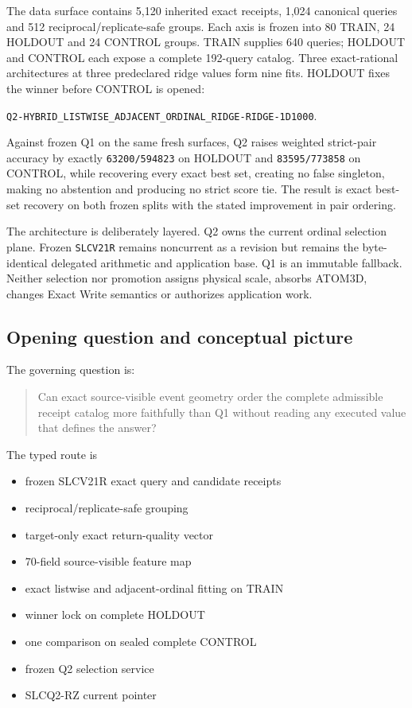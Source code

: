 The data surface contains 5,120 inherited exact receipts, 1,024
canonical queries and 512 reciprocal/replicate-safe groups. Each axis is
frozen into 80 TRAIN, 24 HOLDOUT and 24 CONTROL groups. TRAIN supplies
640 queries; HOLDOUT and CONTROL each expose a complete 192-query
catalog. Three exact-rational architectures at three predeclared ridge
values form nine fits. HOLDOUT fixes the winner before CONTROL is
opened:

\nolinkurl{Q2-HYBRID_LISTWISE_ADJACENT_ORDINAL_RIDGE-RIDGE-1D1000}.

Against frozen Q1 on the same fresh surfaces, Q2 raises weighted
strict-pair accuracy by exactly \texttt{63200/594823} on HOLDOUT and
\texttt{83595/773858} on CONTROL, while recovering every exact best set,
creating no false singleton, making no abstention and producing no
strict score tie. The result is exact best-set recovery on both frozen splits with the stated improvement in pair ordering.

The architecture is deliberately layered. Q2 owns the current ordinal
selection plane. Frozen \texttt{SLCV21R} remains noncurrent as a
revision but remains the byte-identical delegated arithmetic and
application base. Q1 is an immutable fallback. Neither selection nor
promotion assigns physical scale, absorbs ATOM3D, changes Exact Write
semantics or authorizes application work.

\subsection{Opening question and conceptual
picture}\label{viii-ch07-opening-question-and-conceptual-picture}

The governing question is:

\begin{quote}
Can exact source-visible event geometry order the complete admissible
receipt catalog more faithfully than Q1 without reading any executed
value that defines the answer?
\end{quote}

The typed route is

\begin{itemize}
\tightlist
\item
  frozen SLCV21R exact query and candidate receipts
\item
  reciprocal/replicate-safe grouping
\item
  target-only exact return-quality vector
\item
  70-field source-visible feature map
\item
  exact listwise and adjacent-ordinal fitting on TRAIN
\item
  winner lock on complete HOLDOUT
\item
  one comparison on sealed complete CONTROL
\item
  frozen Q2 selection service
\item
  SLCQ2-RZ current pointer
\end{itemize}

